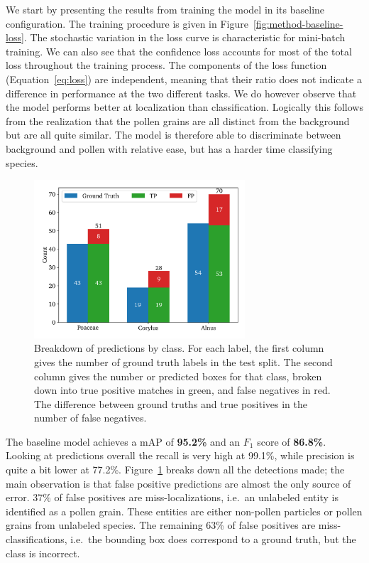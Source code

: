 We start by presenting the results from training the model in its baseline configuration. 
The training procedure is given in Figure~\ref{fig:method-baseline-loss}.
The stochastic variation in the loss curve is characteristic for mini-batch training. 
We can also see that the confidence loss accounts for most of the total loss throughout the training process.
The components of the loss function (Equation~\ref{eq:loss}) are independent, meaning that their ratio does not indicate a difference in performance at the two different tasks.
We do however observe that the model performs better at localization than classification.
Logically this follows from the realization that the pollen grains are all distinct from the background but are all quite similar.
The model is therefore able to discriminate between background and pollen with relative ease, but has a harder time classifying species.

\begin{figure}[htbp]
    \centering
    \includegraphics[width=0.7\textwidth]{figs/results/baseline/detections_test.pdf}
    \caption[Detections by type by class for the baseline on the test split]{%
Breakdown of predictions by class.
For each label, the first column gives the number of ground truth labels in the test split.
The second column gives the number or predicted boxes for that class, broken down into true positive matches in green, and false negatives in red.
The difference between ground truths and true positives in the number of false negatives. 
    }\label{fig:results-baseline-detections}
  \end{figure}

The baseline model achieves a mAP of \textbf{95.2\%} and an \(F_1\) score of \textbf{86.8\%}.
Looking at predictions overall the recall is very high at 99.1\%, while precision is quite a bit lower at 77.2\%.
Figure~\ref{fig:results-baseline-detections} breaks down all the detections made; the main observation is that false positive predictions are almost the only source of error.
37\% of false positives are miss-localizations, i.e.~an unlabeled entity is identified as a pollen grain.
These entities are either non-pollen particles or pollen grains from unlabeled species.
The remaining 63\% of false positives are miss-classifications, i.e.~the bounding box does correspond to a ground truth, but the class is incorrect.

